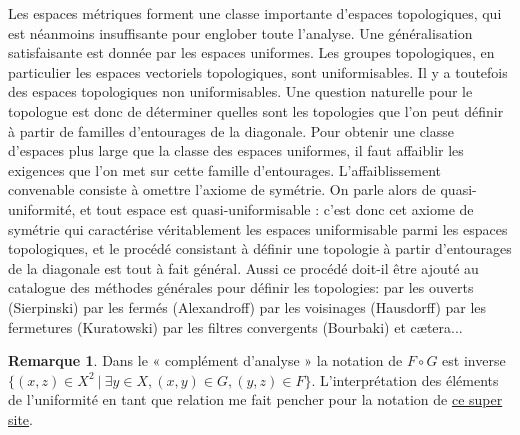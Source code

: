 \documentclass[a4paper, 11pt, french]{book}
\theoremstyle{plain} %
\theoremstyle{definition} %
\newtheorem{remarque}{Remarque}
\theoremstyle{remark} %
\newcommand{\1}{\mathds{1}}
\newcommand\ens[2]{\{#1 \ |\ #2\}}
\begin{document}
Les espaces métriques forment une classe importante d'espaces topologiques, qui est néanmoins insuffisante pour englober toute l’analyse.
Une généralisation satisfaisante est donnée par les espaces uniformes.
Les groupes topologiques, en particulier les espaces vectoriels topologiques, sont uniformisables.
Il y a toutefois des espaces topologiques non uniformisables.
Une question naturelle pour le topologue est donc de déterminer quelles sont les topologies que l'on peut définir à partir de familles d'entourages de la diagonale.
Pour obtenir une classe d'espaces plus large que la classe des espaces uniformes, il faut affaiblir les exigences que l'on met sur cette famille d'entourages.
L'affaiblissement convenable consiste à omettre l'axiome de symétrie.
On parle alors de quasi-uniformité, et tout espace est quasi-uniformisable : c'est donc cet axiome de symétrie qui caractérise véritablement les espaces uniformisable parmi les espaces topologiques, et le procédé consistant à définir une topologie à partir d'entourages de la diagonale est tout à fait général.
Aussi ce procédé doit-il être ajouté au catalogue des méthodes générales pour définir les topologies: par les ouverts (Sierpinski) par les fermés (Alexandroff) par les voisinages (Hausdorff) par les fermetures (Kuratowski) par les filtres convergents (Bourbaki) et cætera...

\begin{remarque}
	Dans le « complément d'analyse » la notation de $F\circ G$ est inverse $\ens{(x, z)\in X^2}{\exists y\in X, (x, y)\in G, (y, z)\in F}$.
	L'interprétation des éléments de l'uniformité en tant que relation me fait pencher pour la notation de \href{https://projects.lsv.ens-paris-saclay.fr/topology/?page_id=2869}{ce super site}.
\end{remarque}
\end{document}
